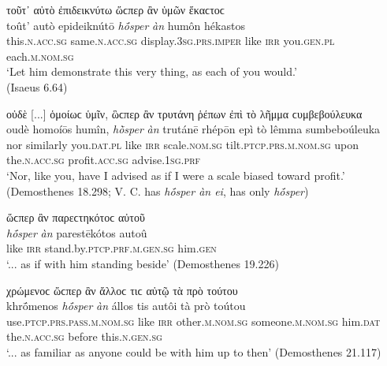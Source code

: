 \begin{exe}
\ex τοῦτ᾽ αὐτὸ ἐπιδεικνύτω ὥϲπερ ἂν ὑμῶν ἕκαϲτοϲ\\
\gll toût' autò epideiknútō \emph{hṓsper} \emph{àn} humôn hékastos\\
this.\textsc{n.acc.sg} same.\textsc{n.acc.sg} display.\textsc{3sg.prs.imper} like \textsc{irr} you.\textsc{gen.pl} each.\textsc{m.nom.sg}\\
\trans `Let him demonstrate this very thing, as each of you would.'\\
(Isaeus 6.64)
\label{osperan10}
\end{exe}

\begin{exe}
\ex οὐδὲ {[}...{]} ὁμοίωϲ ὑμῖν, ὣϲπερ ἂν τρυτάνη ῥέπων ἐπὶ τὸ λῆμμα ϲυμβεβούλευκα\\
\gll oudè homoíōs humîn, \emph{hṑsper} \emph{àn} trutánē rhépōn epì tò lêmma sumbeboúleuka\\
nor similarly you.\textsc{dat.pl} like \textsc{irr} scale.\textsc{nom.sg} tilt.\textsc{ptcp.prs.m.nom.sg} upon the.\textsc{n.acc.sg} profit.\textsc{acc.sg} advise.\textsc{1sg.prf}\\
\trans `Nor, like you, have I advised as if I were a scale biased toward profit.' (Demosthenes 18.298; V. C. has \textit{hṓsper àn ei}, \citet{DindorfBlass1888} has only \textit{hṓsper})
\label{osperan11}
\end{exe}

\begin{exe}
\ex ὥϲπερ ἂν παρεϲτηκότοϲ αὐτοῦ\\
\gll \emph{hṓsper} \emph{àn} parestēkótos autoû\\
like \textsc{irr} stand.by.\textsc{ptcp.prf.m.gen.sg} him.\textsc{gen}\\
\trans `... as if with him standing beside' (Demosthenes 19.226)
\label{osperan12}
\end{exe}

\begin{exe}
\ex χρώμενοϲ ὥϲπερ ἂν ἄλλοϲ τιϲ αὐτῷ τὰ πρὸ τούτου\\
\gll khrṓmenos \emph{hṓsper} \emph{àn} állos tis autôi tà prò toútou\\
use.\textsc{ptcp.prs.pass.m.nom.sg} like \textsc{irr} other.\textsc{m.nom.sg} someone.\textsc{m.nom.sg} him.\textsc{dat} the.\textsc{n.acc.sg} before this.\textsc{n.gen.sg}\\
\trans `... as familiar as anyone could be with him up to then' (Demosthenes 21.117)
\label{osperan13}
\end{exe}

